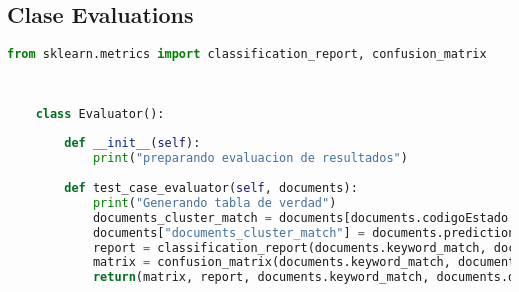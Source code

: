 \documentclass[12pt]{article}
\begin{document}
	
	\subsection{Clase Evaluations}
	\begin{lstlisting}[language=Python, caption = Clase Evaluations]
	from sklearn.metrics import classification_report, confusion_matrix
	
	
	
	class Evaluator():
	    
	    def __init__(self):
	        print("preparando evaluacion de resultados")
	        
	    def test_case_evaluator(self, documents):
	        print("Generando tabla de verdad")
	        documents_cluster_match = documents[documents.codigoEstado == "custom"].prediction.item()
	        documents["documents_cluster_match"] = documents.prediction == documents_cluster_match
	        report = classification_report(documents.keyword_match, documents.documents_cluster_match)
	        matrix = confusion_matrix(documents.keyword_match, documents.documents_cluster_match)
	        return(matrix, report, documents.keyword_match, documents.documents_cluster_match)
	
	\end{lstlisting}
	
	
\end{document}
